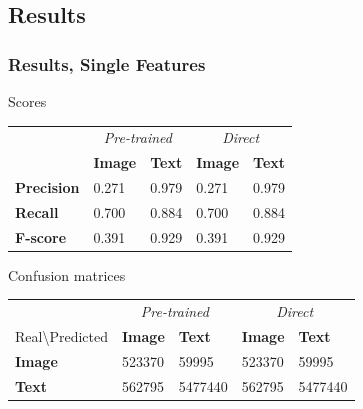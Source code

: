 \subsection{Results}


\begin{frame}
\frametitle{Results, Single Features}

\begin{block}{Scores}
\begin{tabular}{l l l  | l l}
 & \multicolumn{2}{c}{\emph{Pre-trained}} & \multicolumn{2}{c}{\emph{Direct}} \\
& \textbf{Image} & \textbf{Text} & \textbf{Image} & \textbf{Text} \\
\textbf{Precision} & 0.271 & 0.979 & 0.271 & 0.979 \\
\textbf{Recall} & 0.700 & 0.884 & 0.700 & 0.884 \\
\textbf{F-score} & 0.391 & 0.929 & 0.391 & 0.929
\end{tabular}
\end{block}

\begin{block}{Confusion matrices}
\begin{tabular}{l l l | l l }
& \multicolumn{2}{c}{\emph{Pre-trained}} & \multicolumn{2}{c}{\emph{Direct}} \\
Real\textbackslash Predicted & \textbf{Image} & \textbf{Text} & \textbf{Image} & \textbf{Text} \\
\textbf{Image} &  523370&  59995& 523370 & 59995 \\
\textbf{Text} &  562795&  5477440& 562795 & 5477440
\end{tabular}
\end{block}
\end{frame}



